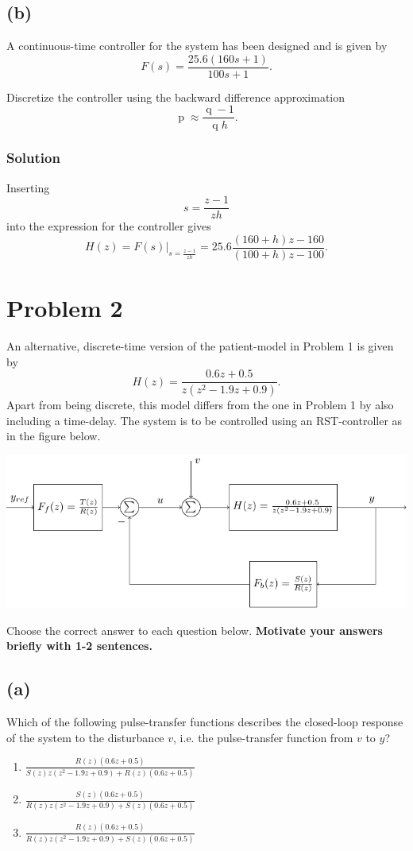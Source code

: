 \documentclass[a4paper]{scrartcl}
\begin{document}
\subsection*{(b)}
\label{sec-1-2}
A continuous-time controller for the system has been designed and is given by 
\[ F(s) = \frac{25.6(160s+1)}{100s+1}. \]

Discretize the controller using the backward difference approximation
\[ \operatorname{p} \approx \frac{\operatorname{q}-1}{\operatorname{q}h}. \]

\subsubsection*{Solution}
\label{sec-1-2-1}
Inserting \[s = \frac{z-1}{zh}\] into the expression for the controller gives
\[ H(z) = F(s)|_{s=\frac{z-1}{zh}} = 25.6\frac{(160+h)z -160}{(100+h)z - 100}. \]

\section*{Problem 2}
\label{sec-2}
An alternative, discrete-time version of the patient-model in Problem 1 is given by
\[ H(z) = \frac{0.6z + 0.5}{z(z^2 - 1.9z + 0.9)}. \]
Apart from being discrete, this model differs from the one in Problem 1 by also including a time-delay.  The system is to be controlled using an RST-controller as in the figure below.
\begin{center}
\includegraphics[width=\linewidth]{rst-block}
\end{center}

Choose the correct answer to each question below. \textbf{Motivate your answers briefly with 1-2 sentences.}


\subsection*{(a)}
\label{sec-2-1}
Which of the following pulse-transfer functions describes the closed-loop response of the system to the disturbance $v$, i.e. the pulse-transfer function from $v$ to $y$?  
\begin{enumerate}
\item \( \frac{R(z) \left(0.6 z + 0.5\right)}{S(z) z \left(z^{2} - 1.9 z + 0.9\right) + R(z) \left(0.6 z + 0.5\right)} \)
\item \(\frac{S(z) \left(0.6 z + 0.5\right)}{R(z) z \left(z^{2} - 1.9 z + 0.9\right) + S(z) \left(0.6 z + 0.5\right)}\)
\item \( \frac{R(z) \left(0.6 z + 0.5\right)}{R(z) z \left(z^{2} - 1.9 z + 0.9\right) + S(z) \left(0.6 z + 0.5\right)} \)
\end{enumerate}
\end{document}
